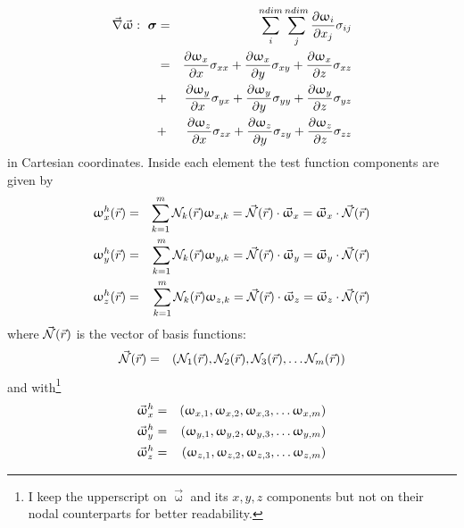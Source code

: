 \begin{eqnarray}
\vec\nabla \vec{\upomega} :\ {\bm \sigma} 
&=& \sum_i^{ndim}\sum_{j}^{ndim} \frac{\partial \upomega _i}{\partial x_j} \sigma_{ij} \nonumber\\
&=& 
\frac{\partial \upomega_x}{\partial x} \sigma_{xx} +
\frac{\partial \upomega_x}{\partial y} \sigma_{xy} +
\frac{\partial \upomega_x}{\partial z} \sigma_{xz} \nonumber\\
&+& 
\frac{\partial \upomega_y}{\partial x} \sigma_{yx} +
\frac{\partial \upomega_y}{\partial y} \sigma_{yy} +
\frac{\partial \upomega_y}{\partial z} \sigma_{yz} \nonumber\\
&+& 
\frac{\partial \upomega_z}{\partial x} \sigma_{zx} +
\frac{\partial \upomega_z}{\partial y} \sigma_{zy} +
\frac{\partial \upomega_z}{\partial z} \sigma_{zz} 
\label{eq:elwf2} 
\end{eqnarray}
in Cartesian coordinates.
Inside each element the test function components are given by
\begin{eqnarray}
\upomega_x^h({\vec r}) &=& \sum_{k=1}^m {\mathcal{N}}_k(\vec{r}) \upomega_{x,k} 
=\vec{{\mathcal{N}}}(\vec{r}) \cdot \vec{\upomega}_x 
=\vec{\upomega}_x \cdot  \vec{{\mathcal{N}}}(\vec{r})
\nonumber\\
\upomega_y^h({\vec r}) &=& \sum_{k=1}^m {\mathcal{N}}_k(\vec{r}) \upomega_{y,k} 
=\vec{{\mathcal{N}}}(\vec{r}) \cdot \vec{\upomega}_y 
=\vec{\upomega}_y \cdot \vec{{\mathcal{N}}}(\vec{r}) 
\nonumber\\
\upomega_z^h({\vec r}) &=& \sum_{k=1}^m {\mathcal{N}}_k(\vec{r}) \upomega_{z,k} 
=\vec{{\mathcal{N}}}(\vec{r}) \cdot \vec{\upomega}_z 
=\vec{\upomega}_z \cdot \vec{{\mathcal{N}}}(\vec{r}) 
\end{eqnarray} 
where $\vec{{\mathcal{N}}}(\vec{r})$ is the vector of basis functions: 
\begin{eqnarray}
\vec{{\mathcal{N}}}(\vec{r}) &=& \left( {\mathcal{N}}_1({\vec r}),  {\mathcal{N}}_2({\vec r}),  
{\mathcal{N}}_3({\vec r}), \dots  {\mathcal{N}}_{m}({\vec r}) \right) 
\end{eqnarray}
and with\footnote{I keep the upperscript on $\vec{\upomega}$ and its $x,y,z$ components 
but not on their nodal counterparts for better readability.}
\begin{eqnarray}
\vec{\upomega}_x^h &=& \left( \upomega_{x,1}, \upomega_{x,2}, \upomega_{x,3}, \dots \upomega_{x,m} \right)\nonumber\\
\vec{\upomega}_y^h &=& \left( \upomega_{y,1}, \upomega_{y,2}, \upomega_{y,3}, \dots \upomega_{y,m} \right)\nonumber\\
\vec{\upomega}_z^h &=& \left( \upomega_{z,1}, \upomega_{z,2}, \upomega_{z,3}, \dots \upomega_{z,m} \right) 
\end{eqnarray}
